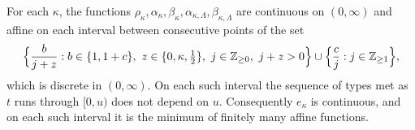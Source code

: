 \begin{lemma}\label{lem:profile-structure}
For each $\kappa$, the functions $\rho_\kappa,\alpha_\kappa,\beta_\kappa,\alpha_{\kappa,\Lambda},
\beta_{\kappa,\Lambda}$ are continuous on $(0,\infty)$ and affine on each interval between
consecutive points of the set
\begin{equation}\label{eq:breakpoints}
  \Bigl\{\frac b{j+z}:b\in\{1,1+c\},\ z\in\{0,\kappa,\tfrac12\},\ j\in\Z_{\ge0},\ j+z>0\Bigr\}
  \cup\Bigl\{\frac cj:j\in\Z_{\ge1}\Bigr\},
\end{equation}
which is discrete in $(0,\infty)$. On each such interval the sequence of types met as $t$ runs
through $[0,u)$ does not depend on $u$. Consequently $e_\kappa$ is continuous, and on each such
interval it is the minimum of finitely many affine functions.
\end{lemma}

